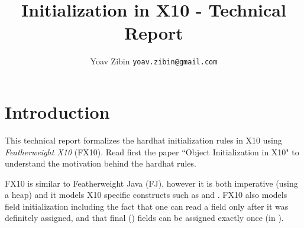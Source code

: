 \documentclass[a4paper]{article}
\title{Initialization in X10 - Technical Report}
\author{Yoav Zibin \texttt{yoav.zibin@gmail.com}}
\date{}
\begin{document}
\maketitle


\lstset{language=java,basicstyle=\ttfamily\small}

\section{Introduction}
This technical report formalizes the hardhat initialization rules in X10
    using \emph{Featherweight X10} (FX10).
Read first the paper ``Object Initialization in X10" to understand the motivation behind the hardhat rules.

FX10 is similar to Featherweight Java (FJ), however it is both imperative (using a heap) and it
    models X10 specific constructs such as \finish and \async.
FX10 also models field initialization including the fact that one can read a field only after it was definitely assigned,
    and that final () fields can be assigned exactly once (in ).
\end{document}
